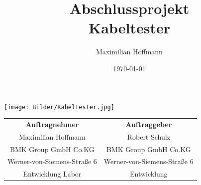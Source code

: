 \documentclass[a4paper,11pt]{scrartcl}
\title{Abschlussprojekt \\ Kabeltester}
\author{Maximilian Hoffmann}
\date{\today}
\begin{document}
\maketitle
\begin{center}
   \texttt{[image: Bilder/Kabeltester.jpg]}
\end{center}

\vspace{1,5cm}

\renewcommand{\arraystretch}{2}
\begin{center}
\begin{tabular}[h] {c|c}
\textbf{Auftragnehmer} 		& 	\textbf{Auftraggeber} 		\\
Maximilian Hoffmann			& 	Robert Schulz				\\
BMK Group GmbH Co.KG		&	BMK Group GmbH Co.KG		\\
Werner-von-Siemens-Straße 6	&	Werner-von-Siemens-Straße 6 \\
Entwicklung Labor			& 	Entwicklung		
\end{tabular}
\renewcommand{\arraystretch}{1}
\end{center}


\newpage


\newpage

\tableofcontents
\newpage


\newpage

\newpage

\newpage

\newpage

\newpage

\newpage

\newpage

\newpage

\newpage

\end{document}
